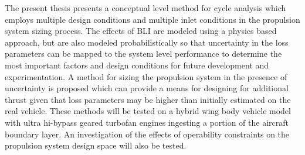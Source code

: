 \begin{summary}
\indent The present thesis presents a conceptual level method for cycle analysis which employs multiple design conditions and multiple inlet conditions in the propulsion system sizing process.  The effects of BLI are modeled using a physics based approach, but are also modeled probabilistically so that uncertainty in the loss parameters can be mapped to the system level performance to determine the most important factors and design conditions for future development and experimentation.  A method for sizing the propulsion system in the presence of uncertainty is proposed which can provide a means for designing for additional thrust given that loss parameters may be higher than initially estimated on the real vehicle.  These methods will be tested on a hybrid wing body vehicle model with ultra hi-bypass geared turbofan engines ingesting a portion of the aircraft boundary layer.  An investigation of the effects of operability constraints on the propulsion system design space will also be tested.


\end{summary}
